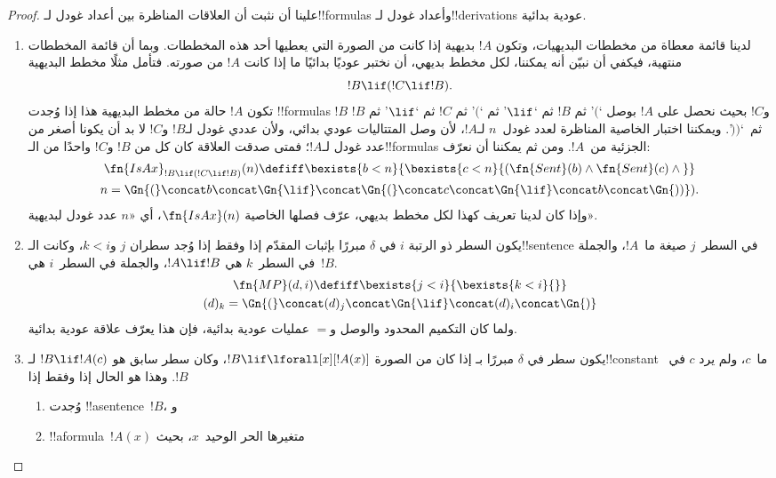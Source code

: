 \documentclass[../../../include/open-logic-section]{subfiles}
\begin{document}
\begin{proof}
علينا أن نثبت أن العلاقات المناظرة بين أعداد غودل لـ!!{formula}s
وأعداد غودل لـ!!{derivation}s عودية بدائية.
\begin{enumerate}
\item لدينا قائمة معطاة من مخططات البديهيات، وتكون $!A$ بديهية إذا
  كانت من الصورة التي يعطيها أحد هذه المخططات. وبما أن قائمة المخططات
  منتهية، فيكفي أن نبيّن أنه يمكننا، لكل مخطط بديهي، أن نختبر عوديًا
  بدائيًا ما إذا كانت $!A$ من صورته. فتأمل مثلًا مخطط البديهية
  \[
  !B \lif (!C \lif !B).
  \]
  تكون $!A$ حالة من مخطط البديهية هذا إذا وُجدت !!{formula}s $!B$
  و$!C$ بحيث نحصل على $!A$ بوصل `$($' ثم $!B$ ثم `$\lif$' ثم `$($'
  ثم $!C$ ثم `$\lif$' ثم $!B$ ثم~`$))$'. ويمكننا اختبار الخاصية
  المناظرة لعدد غودل~$n$ لـ$!A$، لأن وصل المتتاليات عودي بدائي،
  ولأن عددي غودل لـ$!B$ و$!C$ لا بد أن يكونا أصغر من عدد غودل لـ$!A$؛
  فمتى صدقت العلاقة كان كل من $!B$ و$!C$ واحدًا من الـ!!{formula}s
  الجزئية من~$!A$.
  ومن ثم يمكننا أن نعرّف:
  \begin{multline*}
  \fn{IsAx}_{!B \lif (!C \lif !B)}(n) \defiff \bexists{b< n}{
    \bexists{c < n}{(\fn{Sent}(b) \land \fn{Sent}(c) \land {}}}\\ n =
  \Gn{(} \concat b \concat \Gn{\lif} \concat \Gn{(} \concat c \concat
  \Gn{\lif} \concat b \concat \Gn{))}).
  \end{multline*}
  وإذا كان لدينا تعريف كهذا لكل مخطط بديهي، عرّف فصلها الخاصية
  $\fn{IsAx}(n)$، أي «$n$ عدد غودل لبديهية».
\item يكون السطر ذو الرتبة $i$ في $\delta$ مبررًا بإثبات المقدّم إذا
  وفقط إذا وُجد سطران $j$ و$k<i$، وكانت الـ!!{sentence} في السطر~$j$
  صيغة ما~$!A$، والجملة في السطر~$k$ هي $!A\lif !B$، والجملة في
  السطر~$i$ هي~$!B$.
  \begin{multline*}
    \fn{MP}(d, i) \defiff \bexists{j < i}{\bexists{k < i}{}}\\
    (d)_k = \Gn{(} \concat (d)_j
      \concat \Gn{\lif} \concat (d)_i \concat \Gn{)}
  \end{multline*}
  ولما كان التكميم المحدود والوصل و$=$ عمليات عودية بدائية، فإن هذا
  يعرّف علاقة عودية بدائية.
\item يكون سطر في $\delta$ مبررًا بـ\QR{} إذا كان من الصورة
  $!B\lif\lforall[x][!A(x)]$، وكان سطر سابق هو $!B\lif !A(c)$
  لـ!!{constant} ما~$c$، ولم يرد $c$ في~$!B$. وهذا هو الحال إذا وفقط إذا
  \begin{enumerate}
  \item وُجدت !!a{sentence}~$!B$، و
  \item !!a{formula}~$!A(x)$ متغيرها الحر الوحيد~$x$، بحيث

\end{enumerate}
\end{enumerate}
\end{proof}
\end{document}
